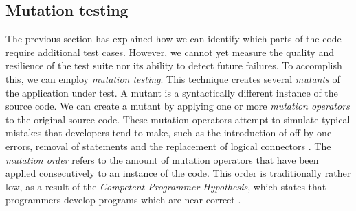 \subsection{Mutation testing}\label{sssec:mutation-testing}
The previous section has explained how we can identify which parts of the code require additional test cases. However, we cannot yet measure the quality and resilience of the test suite nor its ability to detect future failures. To accomplish this, we can employ \emph{mutation testing}. This technique creates several \emph{mutants} of the application under test. A mutant is a syntactically different instance of the source code. We can create a mutant by applying one or more \emph{mutation operators} to the original source code. These mutation operators attempt to simulate typical mistakes that developers tend to make, such as the introduction of off-by-one errors, removal of statements and the replacement of logical connectors \cite{Offutt2001}. The \emph{mutation order} refers to the amount of mutation operators that have been applied consecutively to an instance of the code. This order is traditionally rather low, as a result of the \emph{Competent Programmer Hypothesis}, which states that programmers develop programs which are near-correct \cite{5487526}.

